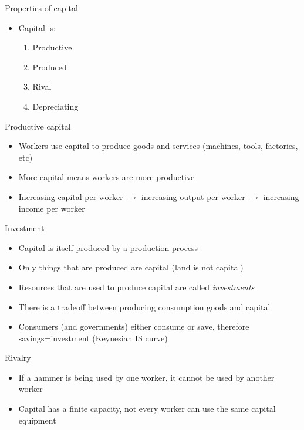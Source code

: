 \documentclass[10pt]{beamer}
\begin{document}
\begin{frame}[label={sec:org0a5805b}]{}
\alert{Properties of capital}
\begin{itemize}
\item Capital is:
\begin{enumerate}
\item Productive
\item Produced
\item Rival
\item Depreciating
\end{enumerate}
\end{itemize}
\end{frame}

\begin{frame}[label={sec:org6a5e3b8}]{}
\alert{Productive capital}
\begin{itemize}
\item Workers use capital to produce goods and services (machines, tools, factories, etc)
\item More capital means workers are more productive
\item Increasing capital per worker \(\rightarrow\) increasing output per worker \(\rightarrow\) increasing income per worker
\end{itemize}
\end{frame}

\begin{frame}[label={sec:org78bb0ac}]{}
\alert{Investment}
\begin{itemize}
\item Capital is itself produced by a production process
\item Only things that are produced are capital (land is not capital)
\item Resources that are used to produce capital are called \emph{investments}
\item There is a tradeoff between producing consumption goods and capital
\item Consumers (and governments) either consume or save, therefore savings=investment (Keynesian IS curve)
\end{itemize}
\end{frame}

\begin{frame}[label={sec:orgd69e4a5}]{}
\alert{Rivalry}
\begin{itemize}
\item If a hammer is being used by one worker, it cannot be used by another worker
\item Capital has a finite capacity, not every worker can use the same capital equipment
\end{itemize}
\end{frame}
\end{document}

